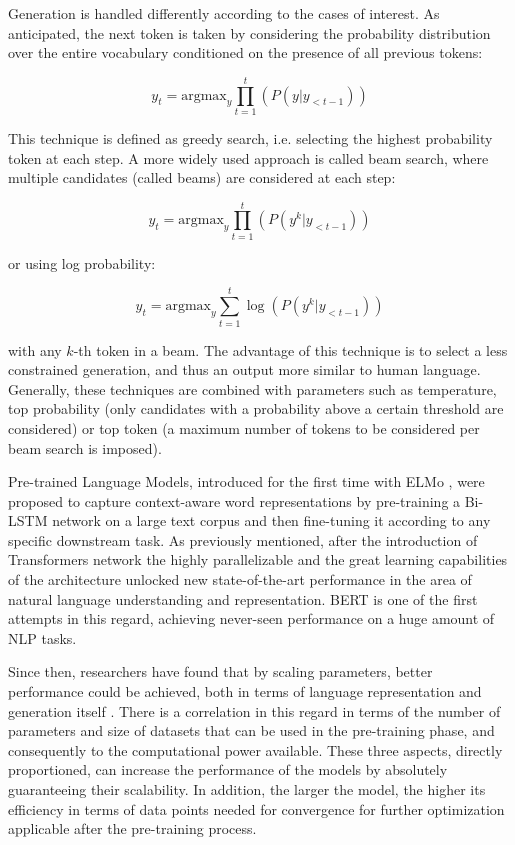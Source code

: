 Generation is handled differently according to the cases of interest. As anticipated, the next token is taken by considering the probability distribution over the entire vocabulary conditioned on the presence of all previous tokens:

\begin{equation*}
    y_t = \text{argmax}_y \prod_{t=1}^t (P(y | y_{<t - 1}))
\end{equation*}

This technique is defined as greedy search, i.e. selecting the highest probability token at each step. A more widely used approach is called beam search, where multiple candidates (called beams) are considered at each step:

\begin{equation*}
    y_t = \text{argmax}_y \prod_{t=1}^t (P(y^k | y_{<t - 1}))
\end{equation*}

or using log probability:

\begin{equation*}
    y_t = \text{argmax}_y \sum_{t=1}^t \log (P(y^k | y_{<t - 1}))
\end{equation*}

with any $k$-th token in a beam. The advantage of this technique is to select a less constrained generation, and thus an output more similar to human language. Generally, these techniques are combined with parameters such as temperature, top probability (only candidates with a probability above a certain threshold are considered) or top token (a maximum number of tokens to be considered per beam search is imposed).

Pre-trained Language Models, introduced for the first time with ELMo \citep{peters-etal-2018-deep}, were proposed to capture context-aware word representations by pre-training a Bi-LSTM network on a large text corpus and then fine-tuning it according to any specific downstream task. As previously mentioned, after the introduction of Transformers network \citep{DBLP:journals/corr/VaswaniSPUJGKP17} the highly parallelizable and the great learning capabilities of the architecture unlocked new state-of-the-art performance in the area of natural language understanding and representation. BERT \citep{devlin-etal-2019-bert} is one of the first attempts in this regard, achieving never-seen performance on a huge amount of NLP tasks.

Since then, researchers have found that by scaling parameters, better performance could be achieved, both in terms of language representation and generation itself \citep{kaplan2020scaling}. There is a correlation in this regard in terms of the number of parameters and size of datasets that can be used in the pre-training phase, and consequently to the computational power available. These three aspects, directly proportioned, can increase the performance of the models by absolutely guaranteeing their scalability. In addition, the larger the model, the higher its efficiency in terms of data points needed for convergence for further optimization applicable after the pre-training process.


